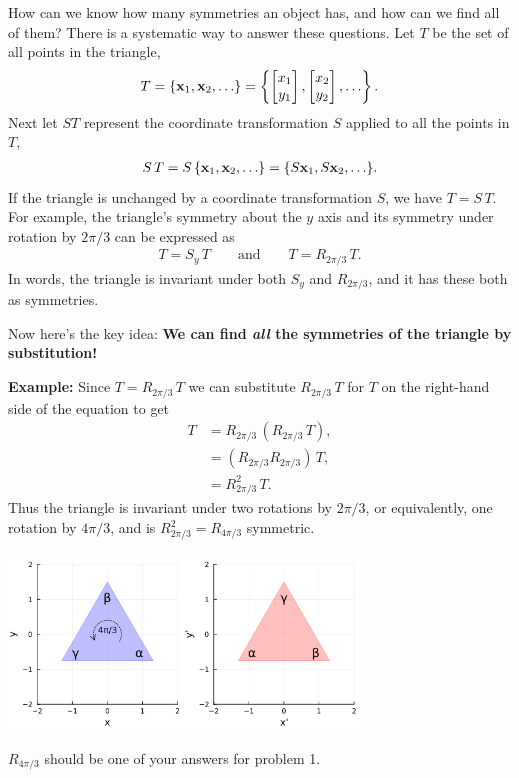 \documentclass[letter]{article}
\newcommand{\bx}{{\bf x}}
\newcommand{\Sy}{S_y}
\begin{document}
How can we know how many symmetries an object has, and how can we find all of them? 
There is a systematic way to answer these questions. Let $T$ be the set of all points
in the triangle,
\begin{align*}
T = \{\bx_1, \bx_2, \ldots\} = \left\{\begin{bmatrix} x_1 \\ y_1 \end{bmatrix}, \begin{bmatrix} x_2 \\ y_2 \end{bmatrix}, \ldots \right\}.
\end{align*}
Next let $ST$ represent the coordinate transformation $S$ applied to all the points in $T$,
\begin{align*}
  S\,T = S \, \{\bx_1, \bx_2, \ldots\} =  \{S\bx_1, S\bx_2, \ldots\}.
\end{align*}
If the triangle is unchanged by a coordinate transformation $S$, we have $T = S\, T$. For example,
the triangle's symmetry about the $y$ axis and its symmetry under rotation by $2\pi/3$ can be expressed
as
\begin{align*}
  T = \Sy\, T \quad \quad \text{and} \quad  \quad T = R_{2\pi/3}\, T.
\end{align*}
In words, the triangle is invariant under both $\Sy$ and $ R_{2\pi/3}$, and it
has these both as symmetries. 

\vspace{4mm}
Now here's the key idea:
{\bf We can find {\em all} the symmetries of the triangle by substitution!}

\vspace{4mm}
{\bf Example:} Since $T = R_{2\pi/3}\, T$ we can substitute $R_{2\pi/3}\, T$ for $T$ on the
right-hand side of the equation to get
\begin{align*}
  T &=  R_{2\pi/3}\, (R_{2\pi/3}\, T), \\
    & = (R_{2\pi/3} R_{2\pi/3})\, T, \\
    & = R_{2\pi/3}^2 \, T.
\end{align*}
Thus the triangle is invariant under two rotations by $2\pi/3$, or equivalently, one rotation by $4\pi/3$,
and is $R_{2\pi/3}^2 = R_{4\pi/3}$ symmetric.
\begin{center}
\includegraphics[width=0.7\textwidth]{triangle-R2.png}
\end{center}
$R_{4\pi/3}$ should be one of your answers for problem 1.
\end{document}
